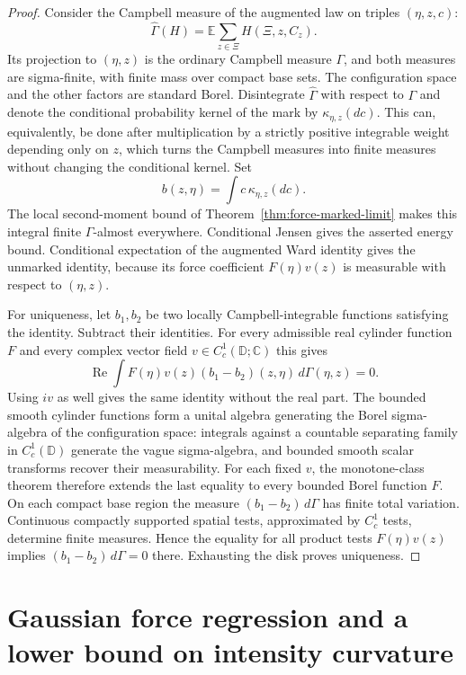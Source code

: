 \documentclass[11pt,a4paper]{article}
\numberwithin{equation}{section}
\theoremstyle{definition}
\theoremstyle{remark}
\newcommand{\D}{\mathbb D}
\newcommand{\E}{\mathbb E}
\newcommand{\C}{\mathbb C}
\begin{document}
\begin{proof}
Consider the Campbell measure of the augmented law on triples
$(\eta,z,c)$:
\[
 \widehat\Gamma(H)=\E\sum_{z\in\Xi}H(\Xi,z,C_z).
\]
Its projection to $(\eta,z)$ is the ordinary Campbell measure
$\Gamma$, and both measures are sigma-finite, with finite mass over
compact base sets. The configuration space and the other factors are
standard Borel. Disintegrate $\widehat\Gamma$ with respect to $\Gamma$
and denote the conditional probability kernel of the mark by
$\kappa_{\eta,z}(dc)$. This can, equivalently, be done after multiplication
by a strictly positive integrable weight depending only on $z$, which
turns the Campbell measures into finite measures without changing the
conditional kernel. Set
\[
 b(z,\eta)=\int c\,\kappa_{\eta,z}(dc).
\]
The local second-moment bound of
Theorem~\ref{thm:force-marked-limit} makes this integral finite
$\Gamma$-almost everywhere. Conditional Jensen gives the asserted
energy bound. Conditional expectation of the augmented Ward identity
gives the unmarked identity, because its force coefficient
$F(\eta)v(z)$ is measurable with respect to $(\eta,z)$.

For uniqueness, let $b_1,b_2$ be two locally Campbell-integrable
functions satisfying the identity. Subtract their identities. For every
admissible real cylinder function $F$ and every complex vector field
$v\in C_c^1(\D;\C)$ this gives
\[
 \operatorname{Re}\int F(\eta)v(z)
              (b_1-b_2)(z,\eta)\,d\Gamma(\eta,z)=0.
\]
Using $iv$ as well gives the same identity without the real part.
The bounded smooth cylinder functions form a unital algebra generating
the Borel sigma-algebra of the configuration space: integrals against
a countable separating family in $C_c^1(\D)$ generate the vague
sigma-algebra, and bounded smooth scalar transforms recover their
measurability. For each fixed $v$, the monotone-class theorem therefore
extends the last equality to every bounded Borel function $F$.
On each compact base region the measure
$(b_1-b_2)\,d\Gamma$ has finite total variation. Continuous compactly
supported spatial tests, approximated by $C_c^1$ tests, determine finite
measures. Hence the equality for all product tests $F(\eta)v(z)$ implies
$(b_1-b_2)\,d\Gamma=0$ there. Exhausting the disk proves uniqueness.
\end{proof}


\section{Gaussian force regression and a lower bound on intensity curvature}
\label{sec:gaussian-force-curvature}
\end{document}
